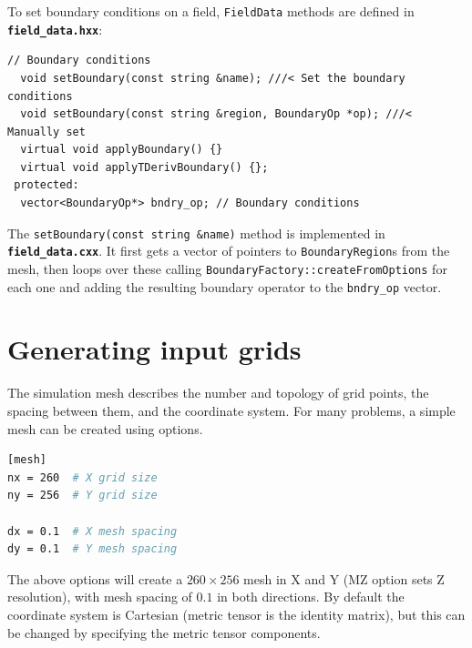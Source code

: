 \documentclass[12pt]{article}
\newcommand{\code}[1]{\texttt{#1}}
\newcommand{\file}[1]{\texttt{\bf #1}}
\begin{document}
To set boundary conditions on a field, \code{FieldData} methods are defined in
\file{field\_data.hxx}:
%
%
\begin{lstlisting}
// Boundary conditions
  void setBoundary(const string &name); ///< Set the boundary conditions
  void setBoundary(const string &region, BoundaryOp *op); ///< Manually set
  virtual void applyBoundary() {}
  virtual void applyTDerivBoundary() {};
 protected:
  vector<BoundaryOp*> bndry_op; // Boundary conditions
\end{lstlisting}
%
The \code{setBoundary(const string \&name)} method is implemented in
\file{field\_data.cxx}. It first gets a vector of pointers to
\code{BoundaryRegion}s from the mesh, then loops over these calling
\code{BoundaryFactory::createFromOptions} for each one and adding the resulting
boundary operator to the \code{bndry\_op} vector.





\section{Generating input grids}
%
\label{sec:gridgen}
%
The simulation mesh describes the number and topology of grid points, the
spacing between them, and the coordinate system. For many problems, a simple
mesh can be created using options.
%
\begin{lstlisting}[language=bash,numbers=none]
[mesh]
nx = 260  # X grid size
ny = 256  # Y grid size

dx = 0.1  # X mesh spacing
dy = 0.1  # Y mesh spacing
\end{lstlisting}
%
The above options will create a $260\times 256$ mesh in X and Y (MZ option sets
Z resolution), with mesh spacing of $0.1$ in both directions. By default the
coordinate system is Cartesian (metric tensor is the identity matrix), but this
can be changed by specifying the metric tensor components.
\end{document}
